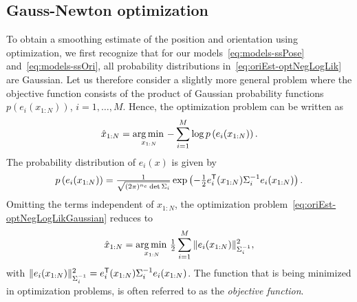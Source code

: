 \subsection{Gauss-Newton optimization}
\label{sec:oriEst-GNopt}
To obtain a smoothing estimate of the position and orientation using optimization, we first recognize that for our models~\eqref{eq:models-ssPose} and~\eqref{eq:models-ssOri}, all probability distributions in~\eqref{eq:oriEst-optNegLogLik} are Gaussian. Let us therefore consider a slightly more general problem where the objective function consists of the product of Gaussian probability functions $p(e_i(x_{1:N}))$, $i = 1, \hdots, M$. Hence, the optimization problem can be written as
\begin{align}
\hat{x}_{1:N} = \operatorname*{arg \, min \,}_{x_{1:N}} - \sum_{i = 1}^M \log p \left(e_i (x_{1:N}) \right). \label{eq:oriEst-optNegLogLikGaussian}
\end{align}
The probability distribution of $e_i(x)$ is given by
\begin{align}
p \left(e_i(x_{1:N}) \right) = \tfrac{1}{\sqrt{ (2 \pi)^{n_e} \det \Sigma_i}} \exp \left( - \tfrac{1}{2} e_i^{\mathsf{T}}(x_{1:N}) \Sigma_i^{-1} e_i(x_{1:N}) \right).
\end{align}
Omitting the terms independent of $x_{1:N}$, the optimization problem~\eqref{eq:oriEst-optNegLogLikGaussian} reduces to
\begin{align}
\label{eq:oriEst-generalNLS}
\hat x_{1:N} = \operatorname*{arg \, min \,}_{x_{1:N}} \tfrac{1}{2} \sum_{i = 1}^M \| e_i(x_{1:N}) \|_{\Sigma_i^{-1}}^2, 
\end{align}
with $\| e_i(x_{1:N}) \|_{\Sigma_i^{-1}}^2 = e^{\mathsf{T}}_i(x_{1:N}) \Sigma_i^{-1} e_i(x_{1:N})$. The function that is being minimized in optimization problems, is often referred to as the \emph{objective function}.

